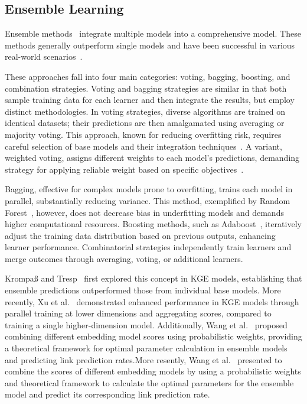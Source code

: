 \documentclass{article}
\begin{document}
\subsection{Ensemble Learning}
Ensemble methods~\cite{zhou2012ensemble} integrate multiple models into a comprehensive model. These methods generally outperform single models and have been successful in various real-world scenarios~\cite{rivas2022ensembles,osamor2021enhancing}. 

These approaches fall into four main categories: voting, bagging, boosting, and combination strategies. Voting and bagging strategies  are similar in that both sample training data for each learner and then integrate the results, but employ distinct methodologies. In voting strategies, diverse algorithms are trained on identical datasets; their predictions are then amalgamated using averaging or majority voting. This approach, known for reducing overfitting risk, requires careful selection of base models and their integration techniques~\cite{a13010026}. A variant, weighted voting, assigns different weights to each model's predictions, demanding strategy for applying reliable weight based on specific objectives~\cite{osamor2021enhancing}.

Bagging, effective for complex models prone to overfitting, trains each model in parallel, substantially reducing variance. This method, exemplified by Random Forest~\cite{breiman2001random}, however, does not decrease bias in underfitting models and demands higher computational resources. Boosting methods, such as  Adaboost~\cite{freund1996experiments}, iteratively adjust the training data distribution based on previous outputs, enhancing learner performance. Combinatorial strategies independently train learners and merge outcomes through averaging, voting, or additional learners.

Krompaß and Tresp~\cite{krompass2015ensemble} first explored this concept in KGE models, establishing that ensemble predictions outperformed those from individual base models. More recently, Xu et al.~\cite{9533372} demonstrated enhanced performance in KGE models through parallel training at lower dimensions and aggregating scores, compared to training a single higher-dimension model. Additionally, Wang et al.~\cite{WANG20221041} proposed combining different embedding model scores using probabilistic weights, providing a theoretical framework for optimal parameter calculation in ensemble models and predicting link prediction rates.More resently, Wang et al.~\cite{WANG20221041} presented to combine the scores of different embedding models by using a probabilistic weights and theoretical framework to calculate the optimal parameters for the ensemble model and predict its corresponding link prediction rate.
\end{document}
